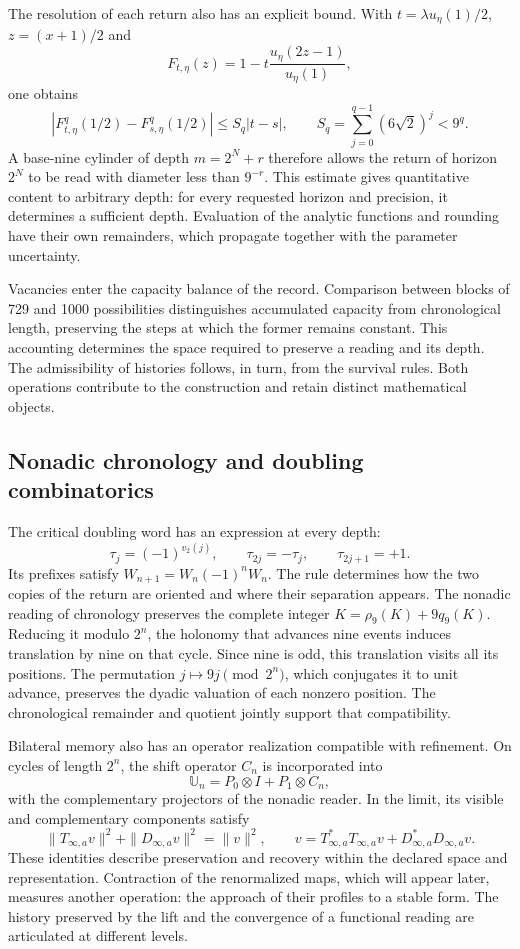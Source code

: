 The resolution of each return also has an explicit bound. With
\(t=\lambda u_\eta(1)/2\), \(z=(x+1)/2\) and
\[
F_{t,\eta}(z)=1-t\frac{u_\eta(2z-1)}{u_\eta(1)},
\]
one obtains
\[
\left|F_{t,\eta}^{q}(1/2)-F_{s,\eta}^{q}(1/2)\right|
\le S_q|t-s|,\qquad S_q=\sum_{j=0}^{q-1}(6\sqrt2)^j<9^q.
\]
A base-nine cylinder of depth \(m=2^N+r\) therefore allows the
return of horizon \(2^N\) to be read with diameter less than \(9^{-r}\). This
estimate gives quantitative content to arbitrary depth: for every
requested horizon and precision, it determines a sufficient depth.
Evaluation of the analytic functions and rounding have their own
remainders, which propagate together with the parameter uncertainty.

Vacancies enter the capacity balance of the record.
Comparison between blocks of 729 and 1000 possibilities distinguishes accumulated
capacity from chronological length, preserving the steps at which the former
remains constant. This accounting determines the space required to
preserve a reading and its depth. The admissibility of histories
follows, in turn, from the survival rules. Both operations
contribute to the construction and retain distinct mathematical objects.

\subsection{Nonadic chronology and doubling combinatorics}

The critical doubling word has an expression at every depth:
\[
\tau_j=(-1)^{v_2(j)},\qquad
\tau_{2j}=-\tau_j,\qquad \tau_{2j+1}=+1.
\]
Its prefixes satisfy \(W_{n+1}=W_n(-1)^nW_n\). The rule determines how
the two copies of the return are oriented and where their separation appears.
The nonadic reading of chronology preserves the complete integer
\(K=\rho_9(K)+9q_9(K)\). Reducing it modulo \(2^n\), the holonomy
that advances nine events induces translation by nine on that cycle. Since
nine is odd, this translation visits all its positions. The
permutation \(j\mapsto9j\pmod{2^n}\), which conjugates it to unit advance,
preserves the dyadic valuation of each nonzero position. The chronological remainder and quotient
jointly support that compatibility.

Bilateral memory also has an operator realization compatible
with refinement. On cycles of length \(2^n\), the shift operator
\(C_n\) is incorporated into
\[
\mathbb U_n=P_0\otimes I+P_1\otimes C_n,
\]
with the complementary projectors of the nonadic reader. In the limit, its
visible and complementary components satisfy
\[
\|T_{\infty,a}v\|^2+\|D_{\infty,a}v\|^2=\|v\|^2,
\qquad
v=T_{\infty,a}^*T_{\infty,a}v+D_{\infty,a}^*D_{\infty,a}v.
\]
These identities describe preservation and recovery within the declared space
and representation. Contraction of the renormalized maps,
which will appear later, measures another operation: the approach of their profiles
to a stable form. The history preserved by the lift and the
convergence of a functional reading are articulated at different levels.

